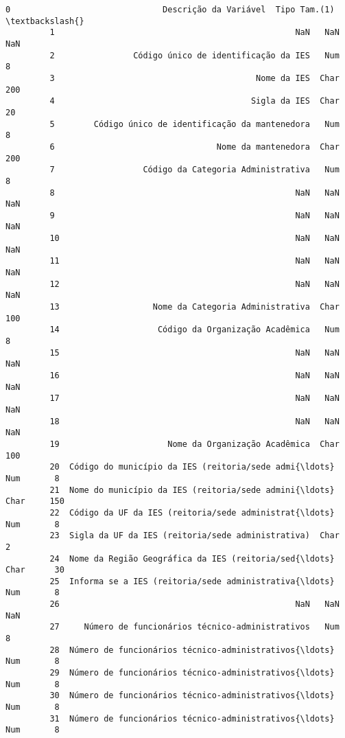\documentclass[11pt]{article}
\begin{document}
\begin{Verbatim}[commandchars=\\\{\}]
         0                               Descrição da Variável  Tipo Tam.(1)  \textbackslash{}
         1                                                 NaN   NaN     NaN   
         2                Código único de identificação da IES   Num       8   
         3                                         Nome da IES  Char     200   
         4                                        Sigla da IES  Char      20   
         5        Código único de identificação da mantenedora   Num       8   
         6                                 Nome da mantenedora  Char     200   
         7                  Código da Categoria Administrativa   Num       8   
         8                                                 NaN   NaN     NaN   
         9                                                 NaN   NaN     NaN   
         10                                                NaN   NaN     NaN   
         11                                                NaN   NaN     NaN   
         12                                                NaN   NaN     NaN   
         13                   Nome da Categoria Administrativa  Char     100   
         14                    Código da Organização Acadêmica   Num       8   
         15                                                NaN   NaN     NaN   
         16                                                NaN   NaN     NaN   
         17                                                NaN   NaN     NaN   
         18                                                NaN   NaN     NaN   
         19                      Nome da Organização Acadêmica  Char     100   
         20  Código do município da IES (reitoria/sede admi{\ldots}   Num       8   
         21  Nome do município da IES (reitoria/sede admini{\ldots}  Char     150   
         22  Código da UF da IES (reitoria/sede administrat{\ldots}   Num       8   
         23  Sigla da UF da IES (reitoria/sede administrativa)  Char       2   
         24  Nome da Região Geográfica da IES (reitoria/sed{\ldots}  Char      30   
         25  Informa se a IES (reitoria/sede administrativa{\ldots}   Num       8   
         26                                                NaN   NaN     NaN   
         27     Número de funcionários técnico-administrativos   Num       8   
         28  Número de funcionários técnico-administrativos{\ldots}   Num       8   
         29  Número de funcionários técnico-administrativos{\ldots}   Num       8   
         30  Número de funcionários técnico-administrativos{\ldots}   Num       8   
         31  Número de funcionários técnico-administrativos{\ldots}   Num       8   

\end{Verbatim}
\end{document}

